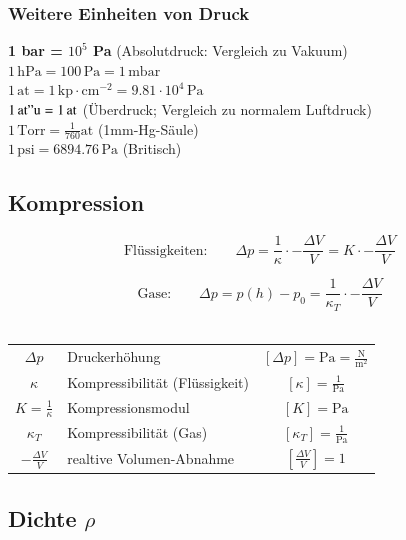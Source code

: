 	
	
	\subsubsection{Weitere Einheiten von Druck}
	\textbf{1 bar = $10^5$ Pa} \qquad (Absolutdruck: Vergleich zu Vakuum)\\
	$ 1 \, \mathrm{hPa} = 100 \, \mathrm{Pa} = 1 \, \mathrm{mbar}$ \\
	$1 \, \mathrm{at} = 1 \, \mathrm{kp \cdot cm^{-2}} = 9.81 \cdot 10^4 \, \mathrm{Pa}$  \\
	$1 \, \mathrm{at"u} = 1 \, \mathrm{at}$ (Überdruck; Vergleich zu normalem Luftdruck) \\
	$1 \, \mathrm{Torr} = \frac{1}{760} \mathrm{at}$ (1mm-Hg-Säule) \\
	$1 \, \mathrm{psi} = 6894.76 \, \mathrm{Pa}$ (Britisch) \\


	
	


\subsection{Kompression}
	
	
	$$ \boxed{ \text{Flüssigkeiten:} \qquad \Delta p = \frac{1}{\kappa} \cdot - \frac{\Delta V}{V} = K \cdot - \frac{\Delta V}{V} } $$  
	
	$$ \boxed{  \text{Gase:} \qquad \Delta p = p(h) - p_0 = \frac{1}{\kappa_T} \cdot - \frac{\Delta V}{V} } $$ \\
	
	
	
	\begin{tabular}{c l c}
		$\Delta p$ & Druckerhöhung & $[\Delta p] = \mathrm{Pa = \frac{N}{m^2}}$ \\
		$\kappa$ & Kompressibilität (Flüssigkeit) & $[\kappa] = \mathrm{\frac{1}{Pa}}$ \\
		$K = \frac{1}{\kappa}$ & Kompressionsmodul & $[K] = \mathrm{Pa}$ \\
		$\kappa_T$ & Kompressibilität (Gas) & $[\kappa_T] = \mathrm{\frac{1}{Pa}}$ \\
		$- \frac{\Delta V}{V}$ & realtive Volumen-Abnahme & $[\frac{\Delta V}{V}] = 1$ 
	\end{tabular}
	
	
	
\subsection{Dichte $\rho$}

